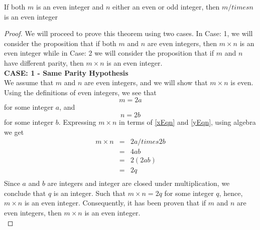 \begin{tcolorbox}
\begin{theorem}
If both $m$ is an even integer and $n$ either an even or odd integer, then $m /times n$ is an even integer
\end{theorem}
\end{tcolorbox}

\begin{proof}
We will proceed to prove this theorem using two cases. In Case: 1, we will consider the proposition that if both $m$ and $n$ are even integers, then $m \times n$ is an even integer while in Case: 2 we will consider the proposition that if $m$ and $n$ have different parity, then $m \times n$ is an even integer. \\

{\bf CASE: 1 - Same Parity Hypothesis} \\
We assume that $m$ and $n$ are even integers, and we will show that $m  \times n$ is even. Using the definitions of even integers, we see that
\begin{equation}
\label{xEqn}
m = 2a
\end{equation}
for some integer $a$, and
\begin{equation}
\label{yEqn}
n = 2b
\end{equation}
for some integer $b$. Expressing $m \times n$ in terms of \ref{xEqn} and \ref{yEqn}, using algebra we get
\begin{eqnarray*}
m \times n & = & 2a /times 2b  \nonumber \\
& = & 4ab \nonumber \\
& = & 2(2ab) \nonumber \\
& = & 2q \nonumber \\
\end{eqnarray*}
Since $a$ and $b$ are integers and integer are closed under multiplication, we conclude that $q$ is an integer. Such that $m \times n = 2q$ for some integer $q$, hence, $m \times n$ is an even integer. Consequently, it has been proven that if $m$ and $n$ are even integers, then $m \times n$ is an even integer. \\


\end{proof}
